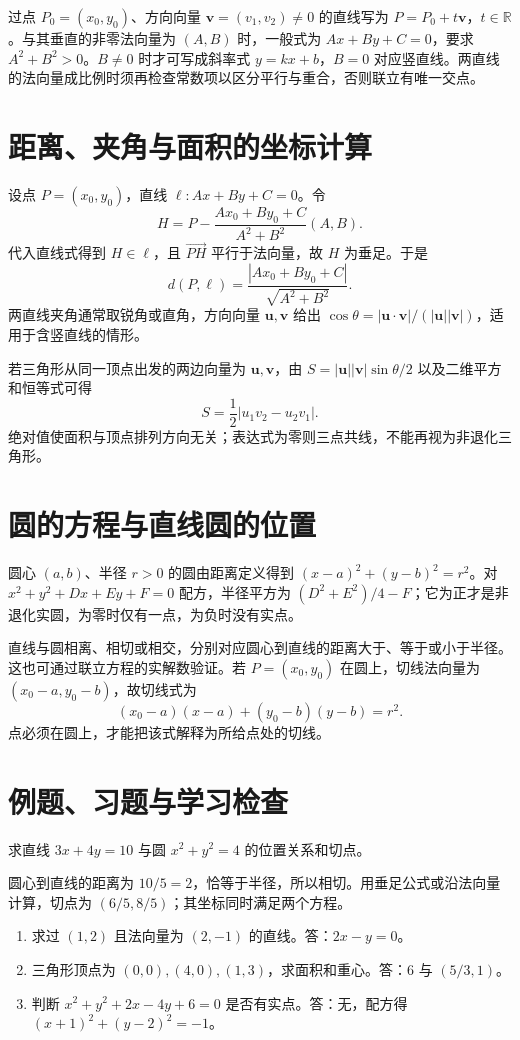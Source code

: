 过点 $P_0=(x_0,y_0)$、方向向量 $\boldsymbol v=(v_1,v_2)\ne0$ 的直线写为 $P=P_0+t\boldsymbol v$，$t\in\mathbb R$。与其垂直的非零法向量为 $(A,B)$ 时，一般式为 $Ax+By+C=0$，要求 $A^2+B^2>0$。$B\ne0$ 时才可写成斜率式 $y=kx+b$，$B=0$ 对应竖直线。两直线的法向量成比例时须再检查常数项以区分平行与重合，否则联立有唯一交点。

\section{距离、夹角与面积的坐标计算}
设点 $P=(x_0,y_0)$，直线 $\ell:Ax+By+C=0$。令
\[
 H=P-\frac{Ax_0+By_0+C}{A^2+B^2}(A,B).
\]
代入直线式得到 $H\in\ell$，且 $\overrightarrow{PH}$ 平行于法向量，故 $H$ 为垂足。于是
\begin{equation}\label{eq:em-point-line}
 d(P,\ell)=\frac{|Ax_0+By_0+C|}{\sqrt{A^2+B^2}}.
\end{equation}
两直线夹角通常取锐角或直角，方向向量 $\boldsymbol u,\boldsymbol v$ 给出 $\cos\theta=|\boldsymbol u\cdot\boldsymbol v|/(|\boldsymbol u||\boldsymbol v|)$，适用于含竖直线的情形。

若三角形从同一顶点出发的两边向量为 $\boldsymbol u,\boldsymbol v$，由 $S=|\boldsymbol u||\boldsymbol v|\sin\theta/2$ 以及二维平方和恒等式可得
\[
 S=\frac12|u_1v_2-u_2v_1|.
\]
绝对值使面积与顶点排列方向无关；表达式为零则三点共线，不能再视为非退化三角形。

\section{圆的方程与直线圆的位置}
圆心 $(a,b)$、半径 $r>0$ 的圆由距离定义得到 $(x-a)^2+(y-b)^2=r^2$。对 $x^2+y^2+Dx+Ey+F=0$ 配方，半径平方为 $(D^2+E^2)/4-F$；它为正才是非退化实圆，为零时仅有一点，为负时没有实点。

直线与圆相离、相切或相交，分别对应圆心到直线的距离大于、等于或小于半径。这也可通过联立方程的实解数验证。若 $P=(x_0,y_0)$ 在圆上，切线法向量为 $(x_0-a,y_0-b)$，故切线式为
\[
 (x_0-a)(x-a)+(y_0-b)(y-b)=r^2.
\]
点必须在圆上，才能把该式解释为所给点处的切线。

\section{例题、习题与学习检查}
\begin{example}
求直线 $3x+4y=10$ 与圆 $x^2+y^2=4$ 的位置关系和切点。
\end{example}
\begin{solve}
圆心到直线的距离为 $10/5=2$，恰等于半径，所以相切。用垂足公式或沿法向量计算，切点为 $(6/5,8/5)$；其坐标同时满足两个方程。
\end{solve}
\begin{enumerate}
\item 求过 $(1,2)$ 且法向量为 $(2,-1)$ 的直线。答：$2x-y=0$。
\item 三角形顶点为 $(0,0),(4,0),(1,3)$，求面积和重心。答：$6$ 与 $(5/3,1)$。
\item 判断 $x^2+y^2+2x-4y+6=0$ 是否有实点。答：无，配方得 $(x+1)^2+(y-2)^2=-1$。
\end{enumerate}

